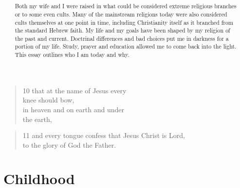 \documentclass[11pt,a4paper]{scrartcl} %
\begin{document}
\begin{verse}
10 that at the name of Jesus every\\ knee should bow,\\ in heaven and on earth and under\\ the earth,
\end{verse}
\begin{verse}
11 and every tongue confess that Jesus Christ is Lord,\\ to the glory of God the Father.
\end{verse} 
\clearpage
\title{\textcolor{Maroon}{\rmfamily\normalfont{}}}
    \author{\textcolor{brown}{}}
    \date{} %
    
    \maketitle
    
 \begin{abstract}
Both my wife and I were raised in what could be considered extreme religious branches or to some even cults. Many of the mainstream religions today were also considered cults themselves at one point in time, including Christianity itself as it branched from the standard Hebrew faith. My life and my goals have been shaped by my religion of the past and current. Doctrinal differences and bad choices put me in darkness for a portion of my life. Study, prayer and education allowed me to come back into the light. This essay outlines who I am today and why.
    \end{abstract}
       
    \tableofcontents

\section{Childhood}
\end{document}
